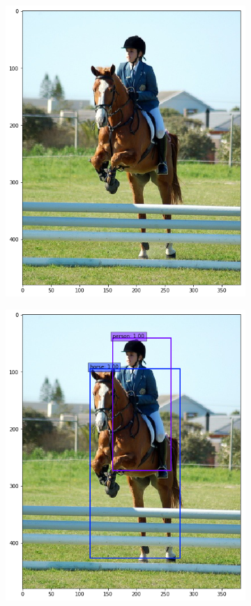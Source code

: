 \documentclass[12pt]{article}
\begin{document}
	\begin{figure}[h]
		\centering
		\begin{subfigure}	[h]{0.4\textwidth}
			\includegraphics[width=\textwidth]{input.png}
		\end{subfigure}
		\hfill
		\begin{subfigure}	[h]{0.4\textwidth}
			\includegraphics[width=\textwidth]{output.png}

\end{subfigure}
\end{figure}
\end{document}
